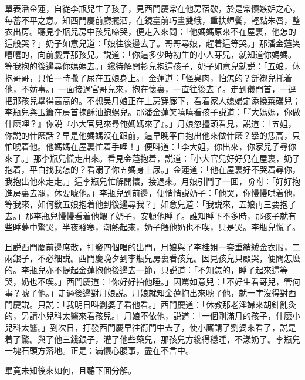 單表潘金蓮，自従李瓶兒生了孩子，見西門慶常在他房宿歇，於是常懷嫉妒之心，每蓄不平之意。知西門慶前廳擺酒，在鏡臺前巧畫雙蛾，重扶蟬鬢，輕點朱唇，整衣出房。聽見李瓶兒房中孩兒啼哭，便走入來問：「他媽媽原來不在屋裏，他怎的這般哭？」奶子如意兒道：「娘往後邊去了。哥哥尋娘，趕着這等哭。」那潘金蓮笑嘻嘻的，向前戲弄那孩兒。説道：「你這多少時初生的小人芽兒，就知道你媽媽。等我抱的後邊尋你媽媽去。」纔待解開衫兒抱這孩子，奶子如意兒就説：「五娘，休抱哥哥，只怕一時撒了尿在五娘身上。」金蓮道：「怪臭肉，怕怎的？㧱襯兒托着他，不妨事。」一面接過官哥兒來，抱在懷裏，一直往後去了。走到儀門首，一逕把那孩兒擧得高高的。不想吴月娘正在上房穿廊下，看着家人媳婦定添換菜碟兒；李瓶兒與玉簫在房首揀酥油蚫螺兒。那潘金蓮笑嘻嘻看孩子説道：「『大媽媽，你做什麽哩？』你説『小大官兒來尋俺媽媽來了』。」月娘忽擡頭看見，説道：「五姐，你説的什麽話？早是他媽媽沒在跟前，這早晚平白抱出他來做什麽？擧的恁高，只怕唬着他。他媽媽在屋裏忙着手哩！」便呌道：「李大姐，你出來，你家兒子尋你來了。」那李瓶兒慌走出來。看見金蓮抱着，説道：「小大官兒好好兒在屋裏，奶子抱着，平白找我怎的？看溺了你五媽身上尿。」金蓮道：「他在屋裏好不哭着尋你，我抱出他來走走。」這李瓶兒忙解開懷，接過來。月娘引鬥了一囬，吩咐：「好好抱進房裏去罷，休要唬他。」李瓶兒到前邊，便悄悄説奶子：「他哭，你慢慢哄着他，等我來，如何敎五娘抱着他到後邊尋我？」如意兒道：「我説來，五娘再三要抱了去。」那李瓶兒慢慢看着他餵了奶子，安頓他睡了。誰知睡下不多時，那孩子就有些睡夢中驚哭，半夜發寒，潮熱起來，奶子餵他奶也不喫，只是哭。李瓶兒慌了。

且説西門慶前邊席散，打發四個唱的出門，月娘與了李桂姐一套重綃絨金衣服，二兩銀子，不必細説。西門慶晚夕到李瓶兒房裏看孩兒。因見孩兒只顧哭，便問怎麽的。李瓶兒亦不提起金蓮抱他後邊去一節，只説道：「不知怎的，睡了起來這等哭，奶也不喫。」西門慶道：「你好好拍他睡。」因罵如意兒：「不好生看哥兒，管何事？唬了他。」走過後邊對月娘説。月娘就知金蓮抱出來唬了他，就一字沒得對西門慶説。只説：「我明日呌劉婆子看他看。」西門慶道：「休教那老淫婦來胡針亂灸的，另請小兒科太醫來看孩兒。」月娘不依他，説道：「一個剛滿月的孩子，什麽小兒科太醫。」到次日，打發西門慶早往衙門中去了，使小廝請了劉婆來看了，説是着了驚。與了他三錢銀子，灌了他些藥兒，那孩兒方纔得穩睡，不漾奶了。李瓶兒一塊石頭方落地。正是：滿懷心腹事，盡在不言中。

畢竟未知後來如何，且聽下囬分解。

